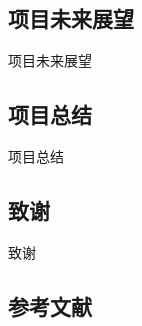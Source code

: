 \documentclass[twoside]{CUGThesis}
\begin{document}
	\subsection{项目未来展望}
	项目未来展望
	\subsection{项目总结}
	项目总结

\begin{spacing}{2}
	\section{致谢}
\end{spacing}
致谢

\begin{spacing}{2}
	\section{参考文献}
\end{spacing}

\end{document}
